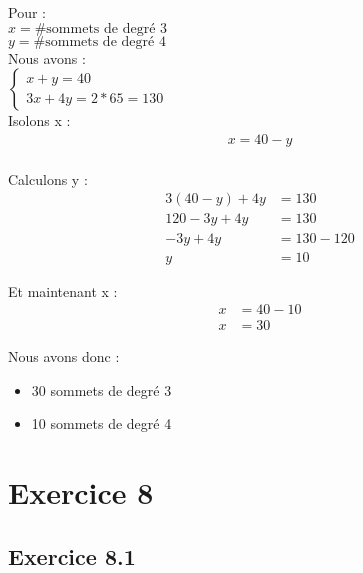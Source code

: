 \documentclass[fontsize=10pt]{article}
\begin{document}
Pour :\\
$x = \#\text{sommets de degré } 3$\\
$y = \#\text{sommets de degré } 4$\\

Nous avons :\\
$\begin{cases}
    x + y = 40\\
    3x + 4y = 2 * 65 = 130
\end{cases}$\\

Isolons x :
\vspace{-.8em}
\begin{align*}
x = 40 - y\\
\end{align*}
\vspace{-3em}

Calculons y :
\vspace{-.8em}
\begin{align*}
    3(40 - y) + 4y &= 130\\
    120 - 3y + 4y &= 130\\
    -3y + 4y &= 130 - 120\\
    y &= 10
\end{align*}

Et maintenant x :
\vspace{-.8em}
\begin{align*}
x &= 40 - 10\\
x &= 30
\end{align*}

Nous avons donc :
\begin{itemize}
    \itemsep0em
    \item 30 sommets de degré 3
    \item 10 sommets de degré 4
\end{itemize}


\section*{Exercice 8}
\subsection*{Exercice 8.1}
\end{document}
